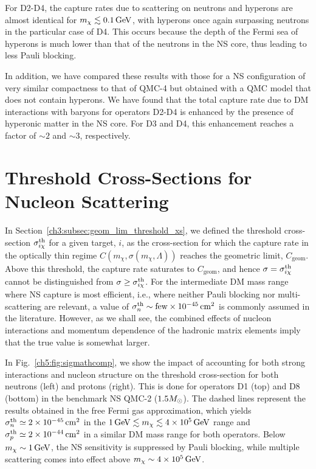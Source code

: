 For D2-D4, the capture rates due to scattering on neutrons and hyperons are almost identical for $m_\chi\lesssim0.1{\rm \,GeV}$, with hyperons once again surpassing neutrons in the particular case of D4.  This occurs because the depth of the Fermi sea of hyperons is much lower than that of the neutrons in the NS core, thus leading to less Pauli blocking. 

In addition, we have compared these results with those for a NS configuration of very similar compactness to that of QMC-4 but obtained with a QMC model that does not contain hyperons. We have found that the total capture rate due to DM interactions with baryons for operators D2-D4 is enhanced by the presence of hyperonic matter in the NS core. For D3 and D4, this enhancement reaches a factor of $\sim 2$ and $\sim 3$, respectively.


\section{Threshold Cross-Sections for Nucleon Scattering}
\label{ch5:sec:sigmath_results}



In Section~\ref{ch3:subsec:geom_lim_threshold_xs}, we defined the threshold cross-section $\sigma^{\rm th}_{i\chi}$ for a given target, $i$, as the cross-section for which the capture rate in the optically thin regime $C(m_\chi,\sigma(m_\chi,\Lambda))$ reaches the geometric limit, $C_\mathrm{geom}$. Above this threshold, the capture rate saturates to $C_\mathrm{geom}$, and hence $\sigma = \sigma^{\rm th}_{i\chi}$ cannot be distinguished from $\sigma\ge\sigma^{\rm th}_{i\chi}$. For the intermediate DM mass range where NS capture is most efficient, i.e., where neither Pauli blocking nor multi-scattering are relevant, a value of $\sigma^\mathrm{th}_n \sim \textrm{few}\times10^{-45}{\rm \,cm}^2$ is commonly assumed in the literature.  However, as we shall see, the combined effects of nucleon interactions and momentum dependence of the hadronic matrix elements imply that the true value is somewhat larger. 


In Fig.~\ref{ch5:fig:sigmathcomp}, we show the impact of accounting for both strong interactions and nucleon structure on the threshold cross-section for both neutrons (left) and protons (right). This is done for operators D1 (top) and D8 (bottom) in the benchmark NS QMC-2 ($1.5M_\odot$). The dashed lines represent the results obtained in the free Fermi gas approximation, which yields $\sigma^\mathrm{th}_n\simeq2\times10^{-45}{\rm \,cm}^2$ in the $1{\rm \,GeV}\lesssim m_\chi\lesssim 4\times 10^5{\rm \,GeV}$ range and $\sigma^\mathrm{th}_p\simeq2\times10^{-44}{\rm \,cm}^2$ in a similar DM mass range for both operators. Below $m_\chi\sim1{\rm \,GeV}$, the NS sensitivity is suppressed by Pauli blocking, while multiple scattering comes into effect above $m_\chi\sim4\times10^5{\rm \,GeV}$. 

